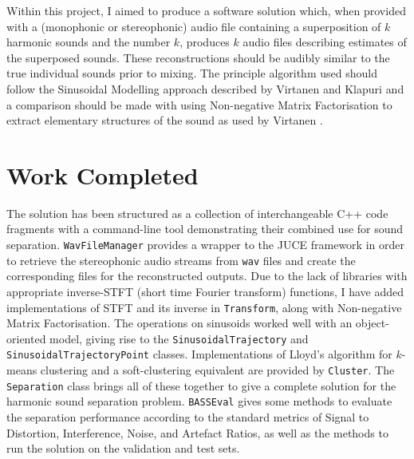 \documentclass[12pt,a4paper,twoside,openright]{report}
\begin{document}
Within this project, I aimed to produce a software solution which, when provided with a (monophonic or stereophonic) audio file containing a superposition of $ k $ harmonic sounds and the number $ k $, produces $ k $ audio files describing estimates of the superposed sounds. These reconstructions should be audibly similar to the true individual sounds prior to mixing. The principle algorithm used should follow the Sinusoidal Modelling approach described by Virtanen and Klapuri \cite{virtanen2000separation} and a comparison should be made with using Non-negative Matrix Factorisation to extract elementary structures of the sound as used by Virtanen \cite{virtanen2003sound}.

\section*{Work Completed}

The solution has been structured as a collection of interchangeable C++ code fragments with a command-line tool demonstrating their combined use for sound separation. \texttt{WavFileManager} provides a wrapper to the JUCE \cite{juce} framework in order to retrieve the stereophonic audio streams from \texttt{wav} files and create the corresponding files for the reconstructed outputs. Due to the lack of libraries with appropriate inverse-STFT (short time Fourier transform) functions, I have added implementations of STFT and its inverse in \texttt{Transform}, along with Non-negative Matrix Factorisation. The operations on sinusoids worked well with an object-oriented model, giving rise to the \texttt{SinusoidalTrajectory} and \texttt{SinusoidalTrajectoryPoint} classes. Implementations of Lloyd's algorithm for $ k $-means clustering and a soft-clustering equivalent are provided by \texttt{Cluster}. The \texttt{Separation} class brings all of these together to give a complete solution for the harmonic sound separation problem. \texttt{BASSEval} gives some methods to evaluate the separation performance according to the standard metrics of Signal to Distortion, Interference, Noise, and Artefact Ratios, as well as the methods to run the solution on the validation and test sets.


\end{document}
